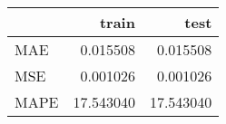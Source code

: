 \begin{tabular}{lrr}
\toprule
{} &      train &       test \\
\midrule
MAE  &   0.015508 &   0.015508 \\
MSE  &   0.001026 &   0.001026 \\
MAPE &  17.543040 &  17.543040 \\
\bottomrule
\end{tabular}
